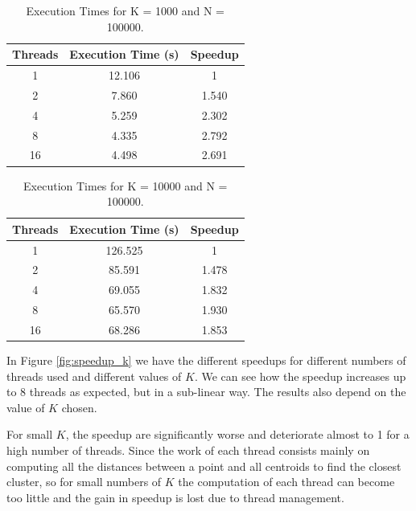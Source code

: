\documentclass[10pt,twocolumn,letterpaper]{article}
\begin{document}
\begin{table}[H]
	\begin{center}
		\begin{tabular}{|c|c|c|}
			\hline
			Threads & Execution Time (s) & Speedup \\
			\hline
			1 & 12.106 & 1 \\ 
			2 & 7.860 & 1.540 \\
			4 & 5.259 & 2.302 \\
			8 & 4.335 & 2.792 \\ 
			16 & 4.498 & 2.691 \\
			\hline
		\end{tabular}
	\end{center}
	\caption{Execution Times for K = 1000 and N = 100000.}
	\label{tab:speedup_k_n_3}
\end{table}

\begin{table}[H]
	\begin{center}
		\begin{tabular}{|c|c|c|}
			\hline
			Threads & Execution Time (s) & Speedup \\
			\hline
			1 & 126.525 & 1 \\ 
			2 & 85.591 & 1.478 \\
			4 & 69.055 & 1.832 \\
			8 & 65.570 & 1.930 \\ 
			16 & 68.286 & 1.853 \\
			\hline
		\end{tabular}
	\end{center}
	\caption{Execution Times for K = 10000 and N = 100000.}
	\label{tab:speedup_k_n_4}
\end{table}

In Figure \ref{fig:speedup_k} we have the different speedups for different numbers of threads used and different values of $K$. We can see how the speedup increases up to 8 threads as expected, but in a sub-linear way.
The results also depend on the value of $K$ chosen. 

For small $K$, the speedup are significantly worse and deteriorate almost to 1 for a high number of threads. Since the work of each thread consists mainly on computing all the distances between a point and all centroids to find the closest cluster, so for small numbers of $K$ the computation of each thread can become too little and the gain in speedup is lost due to thread management.
\end{document}
